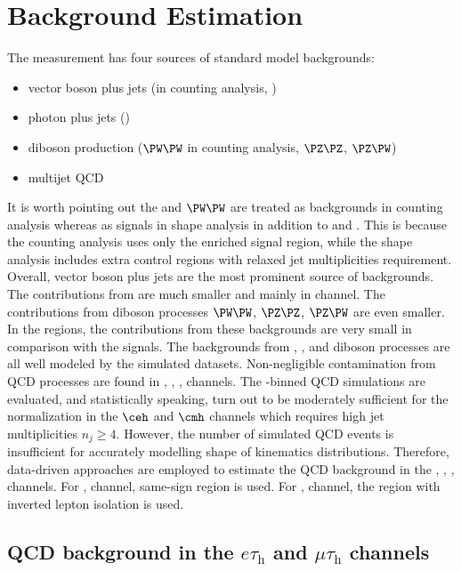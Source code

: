 \section{Background Estimation}
\label{sec:analysis:background}


The \BWl measurement has four sources of standard model backgrounds:

\begin{itemize}
    \item vector boson plus jets (\wjets in counting analysis, \zjets)
    \item photon plus jets (\gjets)
    \item diboson production ($\PW\PW$ in counting analysis, $\PZ\PZ$, $\PZ\PW$)
    \item multijet QCD
\end{itemize}

It is worth pointing out the \wjets and $\PW\PW$ are treated as backgrounds in counting analysis whereas as signals in shape analysis in addition to \ttbar and \tW. This is because the counting analysis uses only the \ttbar enriched signal region, while the shape analysis includes extra control regions with relaxed jet multiplicities requirement. Overall, vector boson plus jets are the most prominent source of backgrounds. The contributions from \gjets are much smaller and mainly in \ceh channel. The contributions from diboson processes $\PW\PW$, $\PZ\PZ$, $\PZ\PW$ are even smaller. In the \ttbar regions, the contributions from these backgrounds are very small in comparison with the signals. The backgrounds from \zjets, \wjets, \gjets and diboson processes are all well modeled by the simulated datasets. Non-negligible contamination from QCD processes are found in \cet, \cmt, \ceh, \cmh channels. The \HT-binned QCD simulations are evaluated, and statistically speaking, turn out to be moderately sufficient for the normalization in the $\ceh$ and $\cmh$ channels which requires high jet multiplicities $n_j\geq 4$. However, the number of simulated QCD events is insufficient for accurately modelling shape of kinematics distributions. Therefore, data-driven approaches are employed to estimate the QCD background in the \cet, \cmt, \ceh, \cmh channels. For \cet, \cmt channel, same-sign region is used. For \ceh, \cmh channel, the region with inverted lepton isolation is used.



\subsection{QCD background in the $e \tau_\mathrm{h}$ and $\mu \tau_\mathrm{h}$ channels}

